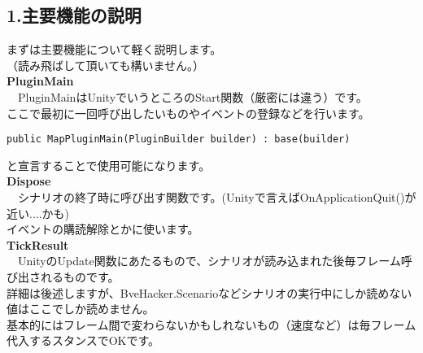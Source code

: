 \documentclass[b5paper,9pt,platex,dvipdfmx]{jsarticle}
\begin{document}
\begin{multicols*}{3}
\part*{1.主要機能の説明}
まずは主要機能について軽く説明します。\\
（読み飛ばして頂いても構いません。）\\
\textbf{PluginMain}\\
　PluginMainはUnityでいうところのStart関数（厳密には違う）です。\\
ここで最初に一回呼び出したいものやイベントの登録などを行います。
\begin{lstlisting}[caption=Sample]
public MapPluginMain(PluginBuilder builder) : base(builder)
\end{lstlisting}
と宣言することで使用可能になります。\\
\textbf{Dispose}\\
　シナリオの終了時に呼び出す関数です。(Unityで言えばOnApplicationQuit()が近い....かも)\\
イベントの購読解除とかに使います。\\
\textbf{TickResult}\\
　UnityのUpdate関数にあたるもので、シナリオが読み込まれた後毎フレーム呼び出されるものです。\\
詳細は後述しますが、BveHacker.Scenarioなどシナリオの実行中にしか読めない値はここでしか読めません。\\
基本的にはフレーム間で変わらないかもしれないもの（速度など）は毎フレーム代入するスタンスでOKです。\\
\\

\end{multicols*}
\end{document}
